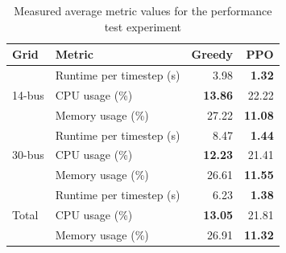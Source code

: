 \begin{table}[htbp]
\centering
\caption{Measured average metric values for the performance test experiment}
\label{tab:exp_metrics_performance}
\begin{tabular}{llrr}
    \toprule
    Grid & Metric & Greedy & PPO \\
    \midrule
    \multirow{3}{*}{14-bus}
        & Runtime per timestep (s) & 3.98 & \textbf{1.32} \\
        & CPU usage (\%)           & \textbf{13.86} & 22.22 \\
        & Memory usage (\%)        & 27.22 & \textbf{11.08} \\
    \midrule
    \multirow{3}{*}{30-bus}
        & Runtime per timestep (s) & 8.47 & \textbf{1.44} \\
        & CPU usage (\%)           & \textbf{12.23} & 21.41 \\
        & Memory usage (\%)        & 26.61 & \textbf{11.55} \\
    \midrule
    \multirow{3}{*}{Total}
        & Runtime per timestep (s) & 6.23 & \textbf{1.38} \\
        & CPU usage (\%)           & \textbf{13.05} & 21.81 \\
        & Memory usage (\%)        & 26.91 & \textbf{11.32} \\
    \bottomrule
\end{tabular}
\end{table}





